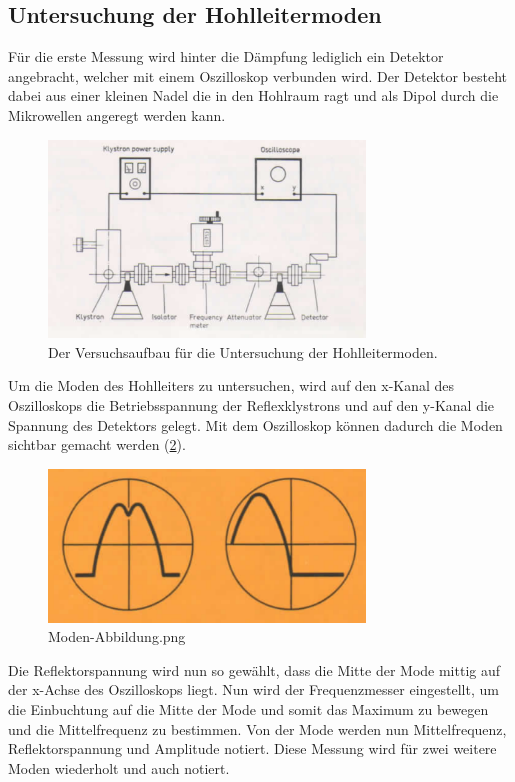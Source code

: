     \subsection{Untersuchung der Hohlleitermoden}
        Für die erste Messung wird hinter die Dämpfung lediglich ein Detektor angebracht, welcher mit einem Oszilloskop verbunden wird.
        Der Detektor besteht dabei aus einer kleinen Nadel die in den Hohlraum ragt und als Dipol durch die Mikrowellen angeregt werden kann.
        \begin{figure}[H]
            \centering
            \includegraphics[width = 0.75\textwidth]{bilder/Aufbau_Teil1.png}
            \caption{Der Versuchsaufbau für die Untersuchung der Hohlleitermoden.}
            \label{fig:Teil1}
        \end{figure}
        Um die Moden des Hohlleiters zu untersuchen, wird auf den x-Kanal des Oszilloskops die Betriebsspannung der Reflexklystrons und auf den y-Kanal die Spannung des Detektors gelegt.
        Mit dem Oszilloskop können dadurch die Moden sichtbar gemacht werden (\ref{fig:Moden-Abbildung}).
        \begin{figure}[H]
            \centering
            \includegraphics[width = 0.75\textwidth]{bilder/Moden-Abbildung.png}
            \caption{Moden-Abbildung.png}
            \label{fig:Moden-Abbildung}
        \end{figure}
        Die Reflektorspannung wird nun so gewählt, dass die Mitte der Mode mittig auf der x-Achse des Oszilloskops liegt.
        Nun wird der Frequenzmesser eingestellt, um die Einbuchtung auf die Mitte der Mode und somit das Maximum zu bewegen und die Mittelfrequenz zu bestimmen.
        Von der Mode werden nun Mittelfrequenz, Reflektorspannung und Amplitude notiert.
        Diese Messung wird für zwei weitere Moden wiederholt und auch notiert.

